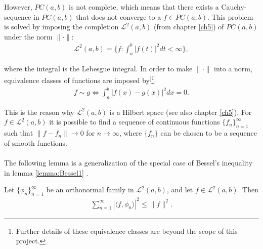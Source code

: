 However, $PC(a,b)$ is not complete, which means that there exists a Cauchy-sequence in $PC(a,b)$ that does not converge to a $f \in PC(a,b)$. This problem is solved by imposing the completion $\mathcal{L}^2(a,b)$ (from chapter \ref{ch5}) of $PC(a,b)$ under the norm $\|\cdot\|$:
\begin{align*}
\mathcal{L}^2(a,b) = \{f: \int_a^b |f(t)|^2 dt < \infty \},
\end{align*}

where the integral is the Lebesgue integral. In order to make $\|\cdot\|$ into a norm, equivalence classes of functions are imposed by$^[$\footnote{Further details of these equivalence classes are beyond the scope of this project.}$^]$
\begin{align*}
f \sim g \Leftrightarrow \int_a^b |f(x) - g(x)|^2 dx = 0.
\end{align*}

This is the reason why $\mathcal{L}^2(a,b)$ is a Hilbert space (see also chapter \ref{ch5}). For $f \in \mathcal{L}^2(a,b)$ it is possible to find a sequence of continuous functions $\{f_n\}_{n=1}^\infty$ such that $\|f - f_n\| \to 0$ for $n \to \infty$, where $\{f_n\}$ can be chosen to be a sequence of smooth functions.
\\ \\
The following lemma is a generalization of the special case of Bessel's inequality in lemma \ref{lemma:Bessel1} \cite{page 75, FAA}.

\begin{lemma} \label{lemma:Bessel2}
Let $\{\phi_n\}_{n=1}^\infty$ be an orthonormal family in $\mathcal{L}^2(a,b)$, and let $f \in \mathcal{L}^2(a,b)$. Then
\begin{align*}
\sum_{n=1}^\infty |\langle f,\phi_n\rangle|^2 \leq \|f\|^2.
\end{align*}
\end{lemma}


